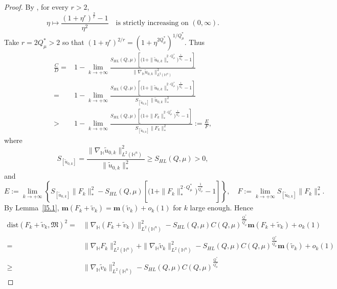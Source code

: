 \documentclass[10pt,a4paper]{amsart}
\begin{document}
\begin{proof}
 {By \cite[Lemma 2.3]{K25}, for every $r>2$,
 \begin{equation}\label{K253}
 \eta\longmapsto \frac{(1+\eta^r)^{\frac{2}{r}}-1}{\eta^2}\quad\text{is strictly increasing on }(0,\infty).
 \end{equation}
Take $r=2Q^{\ast}_{\mu}>2$ so that $(1+\eta^r)^{2/r}=(1+\eta^{2Q^{\ast}_{\mu}})^{1/Q^{\ast}_{\mu}}$. Thus}
 \begin{align*}
 \frac{C}{D}=&1-\lim\limits_{k\rightarrow+\infty}\frac{S_{HL}(Q,\mu) \left[\Big(1+\|\tilde{u}_{0,k}\|_*^{2\cdot Q^{\ast}_{\mu}}\Big)^{\frac{1}{Q^{\ast}_{\mu}}}-1\right]}{\|\nabla_\mathbb{H} \tilde{u}_{0,k}\|_{L^2(\mathbb{H}^n)}^2}\\
 =&1-\lim\limits_{k\rightarrow+\infty}\frac{S_{HL}(Q,\mu) \left[\Big(1+\|\tilde{u}_{0,k}\|_*^{2\cdot Q^{\ast}_{\mu}}\Big)^{\frac{1}{Q^{\ast}_{\mu}}}-1\right]}{S_{[\tilde{u}_{0,k}]}\|\tilde{u}_{0,k}\|_*^2}\\
 >&1-\lim\limits_{k\rightarrow+\infty}\frac{S_{HL}(Q,\mu) \left[\Big(1+\|F_k\|_*^{2\cdot Q^{\ast}_{\mu}}\Big)^{\frac{1}{Q^{\ast}_{\mu}}}-1\right]}{S_{[\tilde{u}_{0,k}]}\|F_k\|_*^2}:=\frac{E}{F},
 \end{align*}
 where
 \begin{equation*}
 S_{[\tilde{u}_{0,k}]}=\frac{\|\nabla_\mathbb{H} \tilde{u}_{0,k}\|_{L^2(\mathbb{H}^n)}^2}{\|\tilde{u}_{0,k}\|_*^2}\geq S_{HL}(Q,\mu)>0,
 \end{equation*}
 and
 \begin{equation*}
 E:=\lim\limits_{k\rightarrow+\infty}\left\{S_{[\tilde{u}_{0,k}]}\|F_k\|_*^2-S_{HL}(Q,\mu) \left[\Big(1+\|F_k\|_*^{2\cdot Q^{\ast}_{\mu}}\Big)^{\frac{1}{Q^{\ast}_{\mu}}}-1\right]\right\},\quad F:=\lim\limits_{k\rightarrow+\infty}S_{[\tilde{u}_{0,k}]}\|F_k\|_*^2.
 \end{equation*}
 {By Lemma~\ref{l5.1}, $\mathbf{m}(F_k+\tilde{v}_k)=\mathbf{m}(\tilde{v}_k)+o_k(1)$ for $k$ large enough. Hence}
 \begin{align*}
 \mathrm{dist}(F_k+\tilde{v}_k,\mathfrak{M})^2=&\|\nabla_\mathbb{H} (F_k+\tilde{v}_k)\|_{L^2(\mathbb{H}^n)}^2-S_{HL}(Q,\mu)C(Q,\mu)^{\frac{Q^{\ast}}{Q^{\ast}_{\mu}}}
 \mathbf{m}(F_k+\tilde{v}_k)+o_k(1)\\
 =&\|\nabla_\mathbb{H} F_k\|_{L^2(\mathbb{H}^n)}^2+\|\nabla_\mathbb{H}\tilde{v}_k\|_{L^2(\mathbb{H}^n)}^2-S_{HL}(Q,\mu)C(Q,\mu)^{\frac{Q^{\ast}}{Q^{\ast}_{\mu}}}
 \mathbf{m}(\tilde{v}_k)+o_k(1)\\
 \geq &\|\nabla_\mathbb{H}\tilde{v}_k\|_{L^2(\mathbb{H}^n)}^2-S_{HL}(Q,\mu)C(Q,\mu)^{\frac{Q^{\ast}}{Q^{\ast}_{\mu}}}

\end{align*}
\end{proof}
\end{document}
